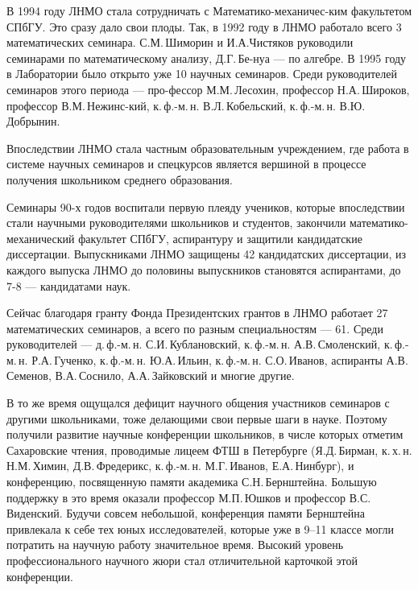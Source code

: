 \ms\abz В 1994 году ЛНМО стала сотрудничать с Математико-механичес-\linebreak ким факультетом СПбГУ. Это сразу дало свои плоды. Так, в 1992 году в ЛНМО работало всего 3 математических семинара. С.М.\,Шиморин и И.А.\linebreak Чистяков руководили семинарами по математическому анализу, Д.Г.\,Бе-\linebreak нуа — по алгебре. В 1995 году в Лаборатории было открыто уже 10 научных семинаров. Среди руководителей семинаров этого периода — про-\linebreak фессор М.М.\,Лесохин, профессор Н.А.\,Широков, профессор В.М.\,Нежинс-\linebreak кий, к.\,ф.-м.\,н. В.Л.\,Кобельский, к.\,ф.-м.\,н. В.Ю.\,Добрынин.

\ms\abz Впоследствии ЛНМО стала частным образовательным учреждением, где работа в системе научных семинаров и спецкурсов является вершиной в процессе получения школьником среднего образования. 

\ms\abz Семинары 90-х годов воспитали первую плеяду учеников, которые впоследствии стали научными руководителями школьников и студентов, закончили математико-механический факультет СПбГУ, аспирантуру и защитили кандидатские диссертации. Выпускниками ЛНМО защищены 42 кандидатских диссертации, из каждого выпуска ЛНМО до половины выпускников становятся аспирантами, до 7-8 — кандидатами наук.

\ms\abz Сейчас благодаря гранту Фонда Президентских грантов в ЛНМО работает 27 математических семинаров, а всего по разным специальностям — 61. Среди руководителей — д.\,ф.-м.\,н. С.И.\,Кублановский, к.\,ф.-м.\,н. А.В.\,Смоленский, к.\,ф.-м.\,н. Р.А.\,Гученко, к.\,ф.-м.\,н. Ю.А.\,Ильин, к.\,ф.-м.\,н. С.О.\,Иванов, аспиранты А.В.\,Семенов, В.А.\,Соснило, А.А.\,Зайковский   и многие другие. 

\ms\abz В то же время ощущался дефицит научного общения участников семинаров с другими школьниками, тоже делающими свои первые шаги в науке. Поэтому получили развитие научные конференции школьников, в числе которых отметим Сахаровские чтения, проводимые лицеем ФТШ в Петербурге (Я.Д.\,Бирман, к.\,х.\,н. Н.М.\,Химин, Д.В.\,Фредерикс, к.\,ф.-м.\,н. М.Г.\,Иванов, Е.А.\,Нинбург), и конференцию, посвященную памяти академика С.Н.\,Бернштейна. Большую поддержку в это время оказали профессор М.П.\,Юшков и профессор В.С.\,Виденский. Будучи совсем небольшой, конференция памяти Бернштейна привлекала к себе тех юных исследователей, которые уже в 9–11 классе могли потратить на научную работу значительное время. Высокий уровень профессионального научного жюри стал отличительной карточкой этой конференции.

